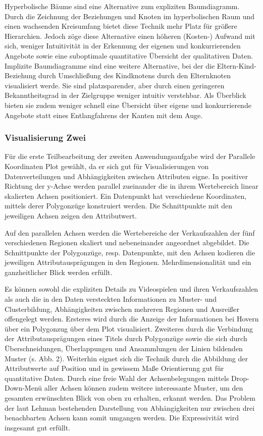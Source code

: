 \documentclass[usegeometry=true]{scrartcl}
\begin{document}
Hyperbolische Bäume sind eine Alternative zum expliziten Baumdiagramm. 
Durch die Zeichnung der Beziehungen und Knoten im hyperbolischen Raum und einen wachsenden Kreisumfang bietet diese Technik mehr Platz für größere Hierarchien.\cite[2f.]{Lamping.1995}
Jedoch zöge diese Alternative einen höheren (Kosten-) Aufwand mit sich, weniger Intuitivität in der Erkennung der eigenen und konkurrierenden Angebote sowie eine suboptimale quantitative Übersicht der qualitativen Daten. 
Implizite Baumdiagramme sind eine weitere Alternative, bei der die Eltern-Kind-Beziehung durch Umschließung des Kindknotens durch den Elternknoten visualisiert werde.\cite[394]{Schulz.2011}
Sie sind platzsparender, aber durch einen geringeren Bekanntheitsgrad in der Zielgruppe weniger intuitiv verstehbar. 
Als Überblick bieten sie zudem weniger schnell eine Übersicht über eigene und konkurrierende Angebote statt eines Entlangfahrens der Kanten mit dem Auge.

\subsubsection{Visualisierung Zwei}
Für die erste Teilbearbeitung der zweiten Anwendungsaufgabe wird der Parallele Koordinaten Plot gewählt, da er sich gut für Visualisierungen von Datenverteilungen und Abhängigkeiten zwischen Attributen eigne.\cite[11]{Chan.2006}
In positiver Richtung der y-Achse werden parallel zueinander die in ihrem Wertebereich linear skalierten Achsen positioniert.
Ein Datenpunkt hat verschiedene Koordinaten, mittels derer Polygonzüge konstruiert werden.
Die Schnittpunkte mit den jeweiligen Achsen zeigen den Attributwert.\cite[25f.]{Inselberg.1987}~\cite[11]{Chan.2006}

Auf den parallelen Achsen werden die Wertebereiche der Verkaufszahlen der fünf verschiedenen Regionen skaliert und nebeneinander angeordnet abgebildet.
Die Schnittpunkte der Polygonzüge, resp. Datenpunkte, mit den Achsen kodieren die jeweiligen Attributausprägungen in den Regionen.
Mehrdimensionalität und ein ganzheitlicher Blick werden erfüllt.

Es können sowohl die expliziten Details zu Videospielen und ihren Verkaufszahlen als auch die in den Daten versteckten Informationen zu Muster- und Clusterbildung, Abhängigkeiten zwischen mehreren Regionen und Ausreißer offengelegt werden.
Ersteres wird durch die Anzeige der Informationen bei Hovern über ein Polygonzug über dem Plot visualisiert. 
Zweiteres durch die Verbindung der Attributausprägungen eines Titels durch Polygonzüge sowie die sich durch Überschneidungen, Überlappungen und Ansammlungen der Linien bildenden Muster (s. Abb. 2). 
Weiterhin eignet sich die Technik durch die Abbildung der Attributwerte auf Position und in gewissem Maße Orientierung gut für quantitative Daten.\cite{Bertin.1982}
Durch eine freie Wahl der Achsenbelegungen mittels Drop-Down-Menü aller Achsen können zudem weitere interessante Muster, um den gesamten erwünschten Blick von oben zu erhalten, erkannt werden. 
Das Problem der laut Lehman bestehenden Darstellung von Abhängigkeiten nur zwischen drei benachbarten Achsen kann somit umgangen werden.\cite[594]{Lehmann.2010}
Die Expressivität wird insgesamt gut erfüllt.
\end{document}
